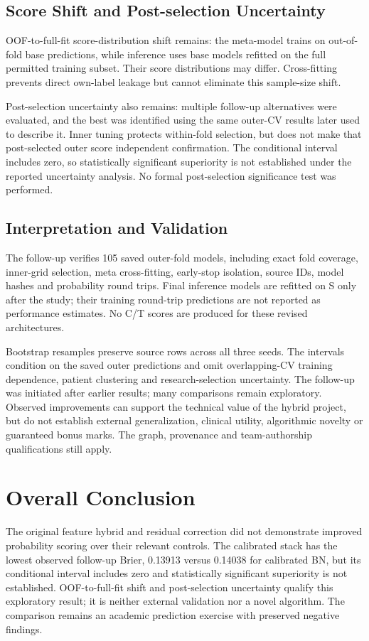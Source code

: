 \documentclass[conference]{IEEEtran}
\begin{document}
\subsection{Score Shift and Post-selection Uncertainty}
OOF-to-full-fit score-distribution shift remains: the meta-model trains on out-of-fold base predictions, while inference uses base models refitted on the full permitted training subset. Their score distributions may differ. Cross-fitting prevents direct own-label leakage but cannot eliminate this sample-size shift.

Post-selection uncertainty also remains: multiple follow-up alternatives were evaluated, and the best was identified using the same outer-CV results later used to describe it. Inner tuning protects within-fold selection, but does not make that post-selected outer score independent confirmation. The conditional interval includes zero, so statistically significant superiority is not established under the reported uncertainty analysis. No formal post-selection significance test was performed.

\subsection{Interpretation and Validation}
The follow-up verifies 105 saved outer-fold models, including exact fold coverage, inner-grid selection, meta cross-fitting, early-stop isolation, source IDs, model hashes and probability round trips. Final inference models are refitted on S only after the study; their training round-trip predictions are not reported as performance estimates. No C/T scores are produced for these revised architectures.

Bootstrap resamples preserve source rows across all three seeds. The intervals condition on the saved outer predictions and omit overlapping-CV training dependence, patient clustering and research-selection uncertainty. The follow-up was initiated after earlier results; many comparisons remain exploratory. Observed improvements can support the technical value of the hybrid project, but do not establish external generalization, clinical utility, algorithmic novelty or guaranteed bonus marks. The graph, provenance and team-authorship qualifications still apply.

\section{Overall Conclusion}
The original feature hybrid and residual correction did not demonstrate improved probability scoring over their relevant controls. The calibrated stack has the lowest observed follow-up Brier, 0.13913 versus 0.14038 for calibrated BN, but its conditional interval includes zero and statistically significant superiority is not established. OOF-to-full-fit shift and post-selection uncertainty qualify this exploratory result; it is neither external validation nor a novel algorithm. The comparison remains an academic prediction exercise with preserved negative findings.
\end{document}
